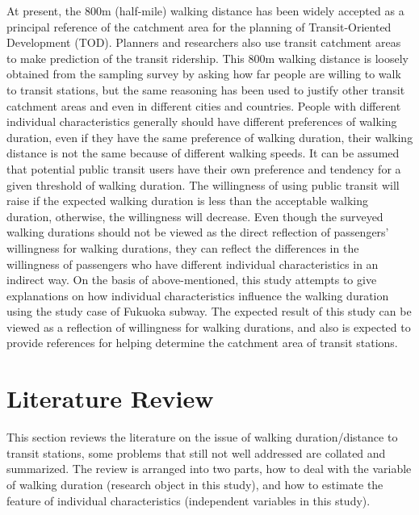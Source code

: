 \documentclass[Journal,letterpaper]{ascelike-new}
\begin{document}
%
At present, the 800m (half-mile) walking distance has been widely accepted as a principal reference of the catchment area for the planning of Transit-Oriented Development (TOD). Planners and researchers also use transit catchment areas to make prediction of the transit ridership. This 800m walking distance is loosely obtained from the sampling survey by asking how far people are willing to walk to transit stations, but the same reasoning has been used to justify other transit catchment areas and even in different cities and countries. People with different individual characteristics generally should have different preferences of walking duration, even if they have the same preference of walking duration, their walking distance is not the same because of different walking speeds. It can be assumed that potential public transit users have their own preference and tendency for a given threshold of walking duration. The willingness of using public transit will raise if the expected walking duration is less than the acceptable walking duration, otherwise, the willingness will decrease. Even though the surveyed walking durations should not be viewed as the direct reflection of passengers' willingness for walking durations, they can reflect the differences in the willingness of passengers who have different individual characteristics in an indirect way. On the basis of above-mentioned, this study attempts to give explanations on how individual characteristics influence the walking duration using the study case of Fukuoka subway. The expected result of this study can be viewed as a reflection of willingness for walking durations, and also is expected to provide references for helping determine the catchment area of transit stations.

%
\section{Literature Review}
This section reviews the literature on the issue of walking duration/distance to transit stations, some problems that still not well addressed are collated and summarized. The review is arranged into two parts, how to deal with the variable of walking duration (research object in this study), and how to estimate the feature of individual characteristics (independent variables in this study).
\end{document}
